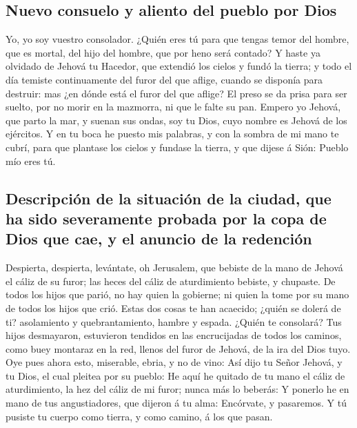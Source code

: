 \hypertarget{nuevo-consuelo-y-aliento-del-pueblo-por-dios}{%
\subsection{Nuevo consuelo y aliento del pueblo por
Dios}\label{nuevo-consuelo-y-aliento-del-pueblo-por-dios}}

 Yo, yo soy vuestro consolador. ¿Quién eres tú para que
tengas temor del hombre, que es mortal, del hijo del hombre, que por
heno será contado?  Y haste ya olvidado de Jehová tu
Hacedor, que extendió los cielos y fundó la tierra; y todo el día
temiste continuamente del furor del que aflige, cuando se disponía para
destruir: mas ¿en dónde está el furor del que aflige?  El
preso se da prisa para ser suelto, por no morir en la mazmorra, ni que
le falte su pan.  Empero yo Jehová, que parto la mar, y
suenan sus ondas, soy tu Dios, cuyo nombre es Jehová de los ejércitos.
 Y en tu boca he puesto mis palabras, y con la sombra de mi
mano te cubrí, para que plantase los cielos y fundase la tierra, y que
dijese á Sión: Pueblo mío eres tú.

\hypertarget{descripciuxf3n-de-la-situaciuxf3n-de-la-ciudad-que-ha-sido-severamente-probada-por-la-copa-de-dios-que-cae-y-el-anuncio-de-la-redenciuxf3n}{%
\subsection{Descripción de la situación de la ciudad, que ha sido
severamente probada por la copa de Dios que cae, y el anuncio de la
redención}\label{descripciuxf3n-de-la-situaciuxf3n-de-la-ciudad-que-ha-sido-severamente-probada-por-la-copa-de-dios-que-cae-y-el-anuncio-de-la-redenciuxf3n}}

 Despierta, despierta, levántate, oh Jerusalem, que bebiste
de la mano de Jehová el cáliz de su furor; las heces del cáliz de
aturdimiento bebiste, y chupaste.  De todos los hijos que
parió, no hay quien la gobierne; ni quien la tome por su mano de todos
los hijos que crió.  Estas dos cosas te han acaecido;
¿quién se dolerá de ti? asolamiento y quebrantamiento, hambre y espada.
¿Quién te consolará?  Tus hijos desmayaron, estuvieron
tendidos en las encrucijadas de todos los caminos, como buey montaraz en
la red, llenos del furor de Jehová, de la ira del Dios tuyo.
 Oye pues ahora esto, miserable, ebria, y no de vino:
 Así dijo tu Señor Jehová, y tu Dios, el cual pleitea por
su pueblo: He aquí he quitado de tu mano el cáliz de aturdimiento, la
hez del cáliz de mi furor; nunca más lo beberás:  Y ponerlo
he en mano de tus angustiadores, que dijeron á tu alma: Encórvate, y
pasaremos. Y tú pusiste tu cuerpo como tierra, y como camino, á los que
pasan.

